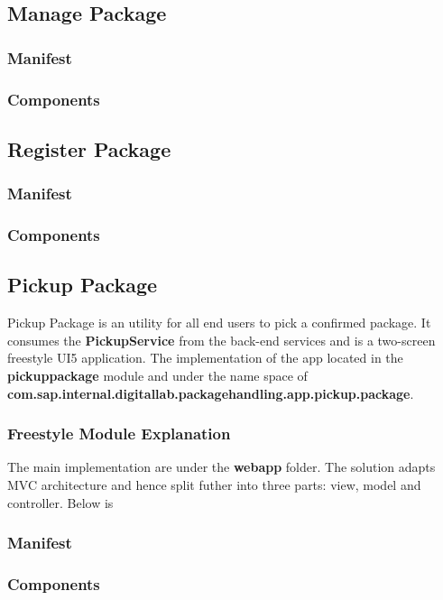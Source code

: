 \subsection{Manage Package}
\subsubsection{Manifest}
\subsubsection{Components}

\subsection{Register Package}
\subsubsection{Manifest}
\subsubsection{Components}

\subsection{Pickup Package}

Pickup Package is an utility for all end users to pick a confirmed package. It consumes the \textbf{PickupService} from the back-end services and is a two-screen freestyle UI5 application. The implementation of the app located in the \textbf{pickuppackage} module and under the name space of \textbf{com.sap.internal.digitallab.packagehandling.app.pickup.package}.

\subsubsection{Freestyle Module Explanation}
The main implementation are under the \textbf{webapp} folder. The solution adapts MVC architecture and hence split futher into three parts: view, model and controller. Below is 
\subsubsection{Manifest}
\subsubsection{Components}


